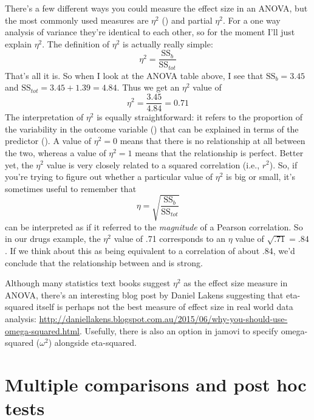 There's a few different ways you could measure the effect size in an ANOVA, but the most commonly used measures are $\eta^2$ () and partial $\eta^2$. For a one way analysis of variance they're identical to each other, so for the moment I'll just explain $\eta^2$. The definition of $\eta^2$ is actually really simple:
$$
\eta^2 = \frac{\mbox{SS}_b}{\mbox{SS}_{tot}}
$$
That's all it is. So when I look at the ANOVA table above, I see that $\mbox{SS}_b = 3.45$  and $\mbox{SS}_{tot} = 3.45 + 1.39 = 4.84$. Thus we get an $\eta^2$ value of 
$$
\eta^2 = \frac{3.45}{4.84} = 0.71
$$
The interpretation of $\eta^2$ is equally straightforward: it refers to the proportion of the variability in the outcome variable () that can be explained in terms of the predictor (). A value of $\eta^2 = 0$ means that there is no relationship at all between the two, whereas a value of $\eta^2 = 1$ means that the relationship is perfect. Better yet, the $\eta^2$ value is very closely related to a squared correlation (i.e., $r^2$). So, if you're trying to figure out whether a particular value of $\eta^2$ is big or small, it's sometimes useful to remember that 
$$
\eta= \sqrt{\frac{\mbox{SS}_b}{\mbox{SS}_{tot}}}
$$
can be interpreted as if it referred to the {\it magnitude} of a Pearson correlation. So in our drugs example, the $\eta^2$ value of .71 corresponds to an $\eta$ value of $\sqrt{.71} = .84$. If we think about this as being equivalent to a correlation of about .84, we'd conclude that the relationship between  and  is strong. 

Although many statistics text books suggest $\eta^2$ as the effect size measure in ANOVA, there's an interesting blog post by Daniel Lakens suggesting that eta-squared itself is perhaps not the best measure of effect size in real world data analysis: \url{http://daniellakens.blogspot.com.au/2015/06/why-you-should-use-omega-squared.html}. Usefully, there is also an option in jamovi to specify omega-squared ($\omega^2$) alongside eta-squared.



\section{Multiple comparisons and post hoc tests~\label{sec:posthoc}}




